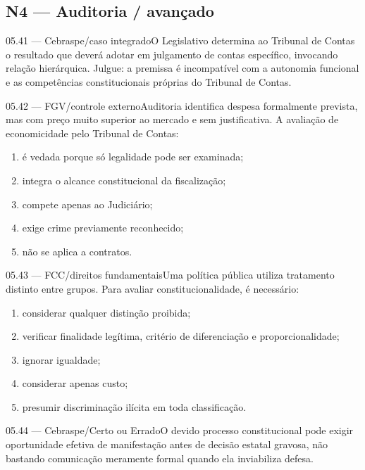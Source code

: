 \subsection*{N4 — Auditoria / avançado}
\begin{questao}{ 05.41 — Cebraspe/caso integrado}O Legislativo determina ao Tribunal de Contas o resultado que deverá adotar em julgamento de contas específico, invocando relação hierárquica. Julgue: a premissa é incompatível com a autonomia funcional e as competências constitucionais próprias do Tribunal de Contas.\end{questao}
\begin{questao}{ 05.42 — FGV/controle externo}Auditoria identifica despesa formalmente prevista, mas com preço muito superior ao mercado e sem justificativa. A avaliação de economicidade pelo Tribunal de Contas:\begin{enumerate}[label=\Alph*)]\item é vedada porque só legalidade pode ser examinada;\item integra o alcance constitucional da fiscalização;\item compete apenas ao Judiciário;\item exige crime previamente reconhecido;\item não se aplica a contratos.\end{enumerate}\end{questao}
\begin{questao}{ 05.43 — FCC/direitos fundamentais}Uma política pública utiliza tratamento distinto entre grupos. Para avaliar constitucionalidade, é necessário:\begin{enumerate}[label=\Alph*)]\item considerar qualquer distinção proibida;\item verificar finalidade legítima, critério de diferenciação e proporcionalidade;\item ignorar igualdade;\item considerar apenas custo;\item presumir discriminação ilícita em toda classificação.\end{enumerate}\end{questao}
\begin{questao}{ 05.44 — Cebraspe/Certo ou Errado}O devido processo constitucional pode exigir oportunidade efetiva de manifestação antes de decisão estatal gravosa, não bastando comunicação meramente formal quando ela inviabiliza defesa.\end{questao}
